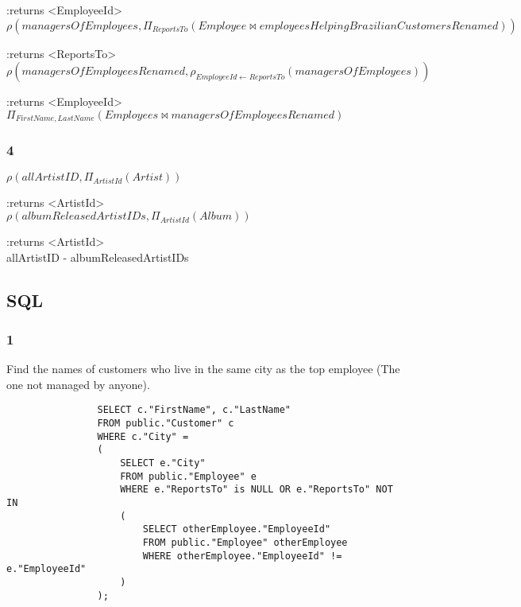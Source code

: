 \documentclass[10pt]{article}
\begin{document}
			:returns <EmployeeId>\\
			
			$ \rho(managersOfEmployees, \Pi_{ReportsTo}(Employee \bowtie employeesHelpingBrazilianCustomersRenamed  )) $
			
			:returns <ReportsTo>\\
			
			$ \rho(managersOfEmployeesRenamed, \rho_{EmployeeId \leftarrow ReportsTo}(managersOfEmployees) ) $
			
			:returns <EmployeeId>\\
			
			$ \Pi_{FirstName, LastName}(Employees \bowtie managersOfEmployeesRenamed) $
			
			\subsubsection*{4}
			
			$ \rho(allArtistID, \Pi_{ArtistId}(Artist)) $
			
			:returns <ArtistId>\\
			
			$ \rho(albumReleasedArtistIDs, \Pi_{ArtistId}(Album)) $

			:returns <ArtistId>\\	
			
			allArtistID	- albumReleasedArtistIDs
			
		\clearpage	
		
		\subsection*{SQL}
		
			\subsubsection*{1}
			
				Find the names of customers who live in the same city as the top employee (The one not managed by anyone).
				
				\begin{lstlisting}
				SELECT c."FirstName", c."LastName" 
				FROM public."Customer" c
				WHERE c."City" = 
				(
					SELECT e."City" 
					FROM public."Employee" e
					WHERE e."ReportsTo" is NULL OR e."ReportsTo" NOT IN
					(
						SELECT otherEmployee."EmployeeId" 
						FROM public."Employee" otherEmployee
						WHERE otherEmployee."EmployeeId" != e."EmployeeId"
					)
				);
				\end{lstlisting}
				
\end{document}
